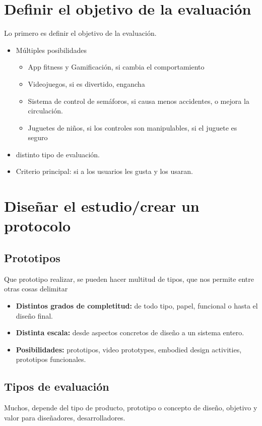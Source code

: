 \documentclass[12pt, twoside, openright]{report} %
\begin{document}
\section{Definir el objetivo de la evaluación}
Lo primero es definir el objetivo de la evaluación.
\begin{itemize}
  \item Múltiples posibilidades
  \begin{itemize}
    \item App fitness y Gamificación, si cambia el comportamiento
    \item Videojuegos, si es divertido, engancha
    \item Sistema de control de semáforos, si causa menos accidentes, o mejora la circulación.
    \item Juguetes de niños, si los controles son manipulables, si el juguete es seguro
  \end{itemize}
  \item distinto tipo de evaluación.
  \item Criterio principal: si a los usuarios les gusta y los usaran. 
\end{itemize}

\section{Diseñar el estudio/crear un protocolo}
\subsection{Prototipos}
Que prototipo realizar, se pueden hacer multitud de tipos, que nos permite entre otras cosas delimitar
\begin{itemize}
  \item \textbf{Distintos grados de completitud:} de todo tipo, papel, funcional o hasta el diseño final.
  \item \textbf{Distinta escala:} desde aspectos concretos de diseño a un sistema entero.
  \item \textbf{Posibilidades:} prototipos, video prototypes, embodied design activities, prototipos funcionales.
\end{itemize}
      
\subsection{Tipos de evaluación}
Muchos, depende del tipo de producto, prototipo o concepto de diseño, objetivo y valor para diseñadores, desarrolladores.
\end{document}
